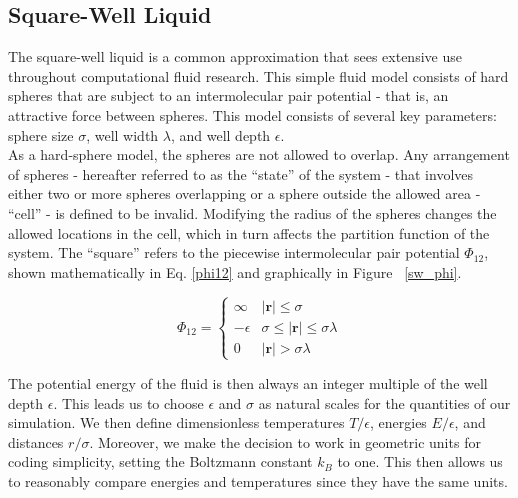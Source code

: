 \documentclass[12pt]{article}
\newcommand{\ignore}[1]{}
\renewcommand{\vec}[1]{\mathbf{#1}}
\begin{document}
\ignore{[move me | For simulation purposes, the system is required to have periodic boundary conditions - that is, when a sphere would classically collide with the wall of the cell it instead breaches the wall and then reappears on the other side of the cell with the same velocity.]}

\subsection{Square-Well Liquid}
The square-well liquid is a common approximation that sees extensive use throughout computational fluid research. This simple fluid model consists of hard spheres that are subject to an intermolecular pair potential - that is, an attractive force between spheres. This model consists of several key parameters: sphere size $\sigma$, well width $\lambda$, and well depth $\epsilon$. \\
As a hard-sphere model, the spheres are not allowed to overlap. Any arrangement of spheres - hereafter referred to as the ``state'' of the system - that involves either two or more spheres overlapping or a sphere outside the allowed area - ``cell'' - is defined to be invalid. Modifying the radius of the spheres changes the allowed locations in the cell, which in turn affects the partition function of the system. The ``square'' refers to the piecewise intermolecular pair potential $\Phi_{12}$, shown mathematically in Eq. \ref{phi12} and graphically in Figure ~\ref{sw_phi}.

\begin{equation} 
\Phi_{12} = \begin{cases}\infty & |\vec{r}|\leq \sigma\\ -\epsilon & \sigma \leq |\vec{r}| \leq \sigma\lambda\\ 0 & |\vec{r}| > \sigma\lambda \end{cases}
\label{phi12}
\end{equation}

The potential energy of the fluid is then always an integer multiple of the well depth $\epsilon$. This leads us to choose $\epsilon$ and $\sigma$ as natural scales for the quantities of our simulation. We then define dimensionless temperatures $T/\epsilon$, energies $E/\epsilon$, and distances $r/\sigma$. Moreover, we make the decision to work in geometric units for coding simplicity, setting the Boltzmann constant $k_B$ to one. This then allows us to reasonably compare energies and temperatures since they have the same units.
\end{document}
